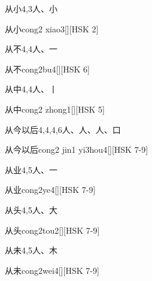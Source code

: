 \begin{Entry}{从小}{4,3}{⼈、⼩}
  \begin{Phonetics}{从小}{cong2 xiao3}[][HSK 2]
  \end{Phonetics}
\end{Entry}

\begin{Entry}{从不}{4,4}{⼈、⼀}
  \begin{Phonetics}{从不}{cong2bu4}[][HSK 6]
  \end{Phonetics}
\end{Entry}

\begin{Entry}{从中}{4,4}{⼈、⼁}
  \begin{Phonetics}{从中}{cong2 zhong1}[][HSK 5]
  \end{Phonetics}
\end{Entry}

\begin{Entry}{从今以后}{4,4,4,6}{⼈、⼈、⼈、⼝}
  \begin{Phonetics}{从今以后}{cong2 jin1 yi3hou4}[][HSK 7-9]
  \end{Phonetics}
\end{Entry}

\begin{Entry}{从业}{4,5}{⼈、⼀}
  \begin{Phonetics}{从业}{cong2ye4}[][HSK 7-9]
  \end{Phonetics}
\end{Entry}

\begin{Entry}{从头}{4,5}{⼈、⼤}
  \begin{Phonetics}{从头}{cong2tou2}[][HSK 7-9]
  \end{Phonetics}
\end{Entry}

\begin{Entry}{从未}{4,5}{⼈、⽊}
  \begin{Phonetics}{从未}{cong2wei4}[][HSK 7-9]
  \end{Phonetics}
\end{Entry}

